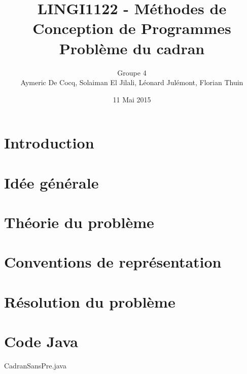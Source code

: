 \documentclass[11pt,a4paper]{article}
\author{Groupe 4\\
Aymeric De Cocq, Solaiman El Jilali, Léonard Julémont, Florian Thuin}
\title{LINGI1122 - Méthodes de Conception de Programmes\\
Problème du cadran}
\date{11 Mai 2015}
\begin{document}
\maketitle

\section* {Introduction}


\section{Idée générale}


 
\section{Théorie du problème}


\section{Conventions de représentation}


\section{Résolution du problème}





\section{Code Java}
 {CadranSansPre.java}
\end{document}
